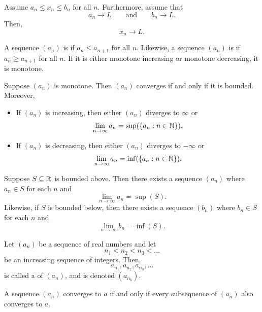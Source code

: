 \documentclass[11pt,twoside=off,numbers=noenddot]{scrbook}
\begin{document}
\begin{theorem}
    Assume $a_n \leq x_n \leq b_n$ for all $n$. Furthermore, assume that
    \[ a_n \to L \qquad \text{and} \qquad b_n \to L. \]
    Then,
    \[ x_n \to L. \]
\end{theorem}

\begin{definition}
    A sequence $(a_n)$ is  if $a_n \leq a_{n + 1}$ for all $n$. Likewise, a sequence $(a_n)$ is  if $a_n \geq a_{n + 1}$ for all $n$. If it is either monotone increasing or monotone decreasing, it is monotone.
\end{definition}

\begin{theorem}
    Suppose $(a_n)$ is monotone. Then $(a_n)$ converges if and only if it is bounded. Moreover,
    \begin{itemize}
        \item If $(a_n)$ is increasing, then either $(a_n)$ diverges to $\infty$ or
        \[ \lim_{n \to \infty} a_n = \sup(\{ a_n : n \in \mathbb N \}). \]
        \item If $(a_n)$ is decreasing, then either $(a_n)$ diverges to $-\infty$ or
        \[ \lim_{n \to \infty} a_n = \inf(\{ a_n : n \in \mathbb N \}). \]
    \end{itemize}
\end{theorem}

\begin{proposition}
    Suppose $S \subseteq \mathbb R$ is bounded above. Then there exists a sequence $(a_n)$ where $a_n \in S$ for each $n$ and
    \[ \lim_{n \to \infty} a_n = \sup(S). \]
    Likewise, if $S$ is bounded below, then there exists a sequence $(b_n)$ where $b_n \in S$ for each $n$ and
    \[ \lim_{n \to \infty} b_n = \inf(S). \]
\end{proposition}

\begin{definition}
    Let $(a_n)$ be a sequence of real numbers and let
    \[ n_1 < n_2 < n_3 < \dots \]
    be an increasing sequence of integers. Then,
    \[ a_{n_1}, a_{n_2}, a_{n_3}, \dots \]
    is called a  of $(a_n)$, and is denoted $(a_{n_k})$.
\end{definition}

\begin{proposition}
    A sequence $(a_n)$ converges to $a$ if and only if every subsequence of $(a_n)$ also converges to $a$.
\end{proposition}
\end{document}
